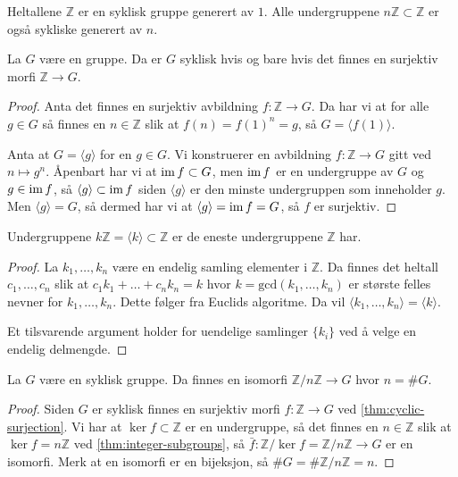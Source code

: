 \begin{example}
    Heltallene $\mathbb Z$ er en syklisk gruppe generert av $1$.
    Alle undergruppene $n\mathbb Z\subset \mathbb Z$ er også sykliske generert av
    $n$.
\end{example}

\begin{lemma}\label{thm:cyclic-surjection}
    La $G$ være en gruppe.
    Da er $G$ syklisk hvis og bare hvis det finnes en surjektiv morfi
    $\mathbb Z\to G$.
\end{lemma}
\begin{proof}
    Anta det finnes en surjektiv avbildning $f\colon \mathbb Z\to G$.
    Da har vi at for alle $g\in G$ så finnes en $n\in \mathbb Z$ slik at
    $f(n) = f(1)^n = g$, så $G = \langle f(1)\rangle$.

    Anta at $G = \langle g \rangle$ for en $g\in G$.
    Vi konstruerer en avbildning $f\colon \mathbb Z\to G$
    gitt ved $n\mapsto g^n$.
    Åpenbart har vi at $\operatorname{im} f\subset G$,
    men $\operatorname{im} f$ er en undergruppe av $G$ og $g\in \operatorname{im} f$,
    så $\langle g\rangle\subset \operatorname{im} f$ siden $\langle g\rangle$
    er den minste undergruppen som inneholder $g$.
    Men $\langle g\rangle = G$,
    så dermed har vi at $\langle g \rangle = \operatorname{im} f = G$,
    så $f$ er surjektiv.
\end{proof}

\begin{corollary}\label{thm:integer-subgroups}
    Undergruppene $k\mathbb Z = \langle k\rangle \subset \mathbb Z$
    er de eneste undergruppene $\mathbb Z$ har.
\end{corollary}
\begin{proof}
    La $k_1, \dots, k_n$ være en endelig samling elementer i $\mathbb Z$.
    Da finnes det heltall $c_1,\dots,c_n$ slik at $c_1 k_1 + \dots + c_n k_n = k$
    hvor $k = \mathrm{gcd}(k_1,\dots,k_n)$
    er største felles nevner for $k_1,\dots, k_n$.
    Dette følger fra Euclids algoritme.
    Da vil $\langle k_1,\dots, k_n\rangle = \langle k\rangle$.

    Et tilsvarende argument holder for uendelige samlinger $\{k_i\}$
    ved å velge en endelig delmengde.
\end{proof}

\begin{corollary}
    La $G$ være en syklisk gruppe.
    Da finnes en isomorfi $\mathbb Z / n\mathbb Z\to G$
    hvor $n = \# G$.
\end{corollary}
\begin{proof}
    Siden $G$ er syklisk finnes en surjektiv morfi $f\colon \mathbb Z\to G$
    ved \cref{thm:cyclic-surjection}.
    Vi har at $\ker f\subset \mathbb Z$ er en undergruppe,
    så det finnes en $n\in \mathbb Z$ slik at
    $\ker f = n\mathbb Z$ ved \cref{thm:integer-subgroups},
    så $\bar f\colon \mathbb Z / \ker f = \mathbb Z / n\mathbb Z\to G$
    er en isomorfi.
    Merk at en isomorfi er en bijeksjon, så $\# G = \# \mathbb Z / n\mathbb Z = n$.
\end{proof}

